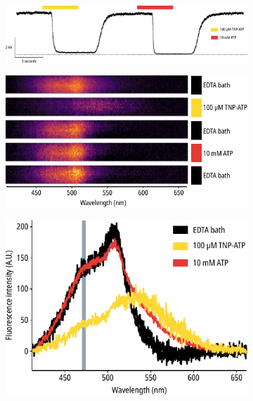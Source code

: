 \begin{figure}[h]
	\centering
	\begin{subfigure}[t]{0.9\textwidth}
		\caption{}\label{ch3fig:atp_tnpatp_trace}
		\centering
		\includegraphics[width=\textwidth]{atp_tnpatp_trace.pdf}
	\end{subfigure}
	\vfill
	\begin{subfigure}[t]{0.5\textwidth}
		\caption{}\label{ch3fig:atp_tnpatp_spectra_1}
		\centering
		\includegraphics[width=\textwidth]{atp_tnpatp_spectral_images.pdf}
	\end{subfigure}
	\hfill
	\begin{subfigure}[t]{0.4\textwidth}
		\caption{}\label{ch3fig:atp_tnpatp_spectra_2}
		\centering
		\includegraphics[width=\textwidth]{atp_tnpatp_spectral_traces.pdf}

\end{subfigure}
\end{figure}
